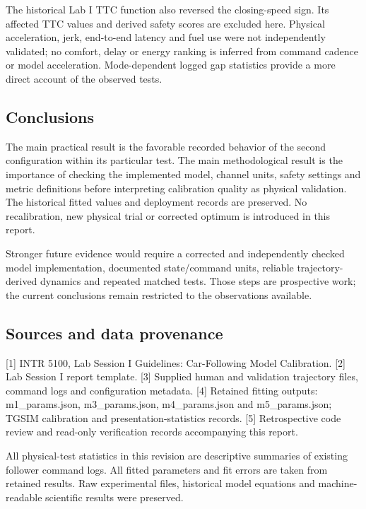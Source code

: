 \documentclass[11pt,a4paper]{article}
\begin{document}
The historical Lab I TTC function also reversed the closing-speed sign. Its affected TTC values and derived safety scores are excluded here. Physical acceleration, jerk, end-to-end latency and fuel use were not independently validated; no comfort, delay or energy ranking is inferred from command cadence or model acceleration. Mode-dependent logged gap statistics provide a more direct account of the observed tests.


\subsection*{Conclusions}

The main practical result is the favorable recorded behavior of the second configuration within its particular test. The main methodological result is the importance of checking the implemented model, channel units, safety settings and metric definitions before interpreting calibration quality as physical validation. The historical fitted values and deployment records are preserved. No recalibration, new physical trial or corrected optimum is introduced in this report.


Stronger future evidence would require a corrected and independently checked model implementation, documented state/command units, reliable trajectory-derived dynamics and repeated matched tests. Those steps are prospective work; the current conclusions remain restricted to the observations available.


\subsection*{Sources and data provenance}

[1] INTR 5100, Lab Session I Guidelines: Car-Following Model Calibration. [2] Lab Session I report template. [3] Supplied human and validation trajectory files, command logs and configuration metadata. [4] Retained fitting outputs: m1\_params.json, m3\_params.json, m4\_params.json and m5\_params.json; TGSIM calibration and presentation-statistics records. [5] Retrospective code review and read-only verification records accompanying this report.


All physical-test statistics in this revision are descriptive summaries of existing follower command logs. All fitted parameters and fit errors are taken from retained results. Raw experimental files, historical model equations and machine-readable scientific results were preserved.
\end{document}
